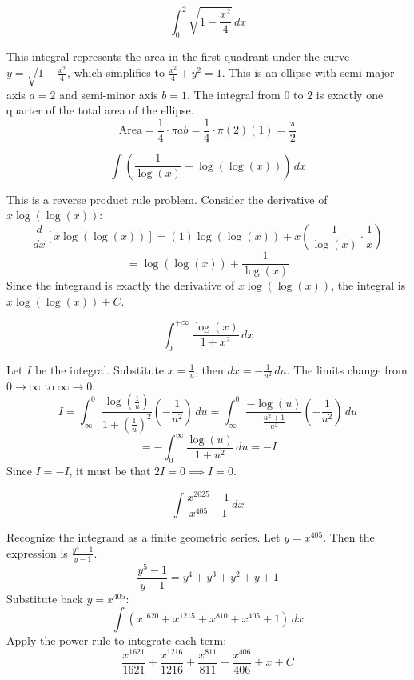 \begin{questions}
    \question \[\int_0^2 \sqrt{1 - \frac{x^2}{4}} \,dx\]
    \begin{solution}
        This integral represents the area in the first quadrant under the curve $y = \sqrt{1 - \frac{x^2}{4}}$, which simplifies to $\frac{x^2}{4} + y^2 = 1$.
        This is an ellipse with semi-major axis $a=2$ and semi-minor axis $b=1$.
        The integral from $0$ to $2$ is exactly one quarter of the total area of the ellipse.
        \[\text{Area} = \frac{1}{4} \cdot \pi a b = \frac{1}{4} \cdot \pi(2)(1) = \frac{\pi}{2}\]
    \end{solution}

    \question \[\int \left( \frac{1}{\log(x)} + \log(\log(x)) \right) \,dx\]
    \begin{solution}
        This is a reverse product rule problem. Consider the derivative of $x \log(\log(x))$:
        \[\frac{d}{dx} \left[ x \log(\log(x)) \right] = (1)\log(\log(x)) + x \left( \frac{1}{\log(x)} \cdot \frac{1}{x} \right)\]
        \[= \log(\log(x)) + \frac{1}{\log(x)}\]
        Since the integrand is exactly the derivative of $x \log(\log(x))$, the integral is $x \log(\log(x)) + C$.
    \end{solution}

    \question \[\int_0^{+\infty} \frac{\log(x)}{1+x^2} \,dx\]
    \begin{solution}
        Let $I$ be the integral. Substitute $x = \frac{1}{u}$, then $dx = -\frac{1}{u^2}\,du$.
        The limits change from $0 \to \infty$ to $\infty \to 0$.
        \[I = \int_\infty^0 \frac{\log(\frac{1}{u})}{1+(\frac{1}{u})^2} \left(-\frac{1}{u^2}\right) \,du = \int_\infty^0 \frac{-\log(u)}{\frac{u^2+1}{u^2}} \left(-\frac{1}{u^2}\right) \,du\]
        \[= -\int_0^\infty \frac{\log(u)}{1+u^2} \,du = -I\]
        Since $I = -I$, it must be that $2I = 0 \implies I = 0$.
    \end{solution}

    \question \[\int \frac{x^{2025} - 1}{x^{405} - 1} \,dx\]
    \begin{solution}
        Recognize the integrand as a finite geometric series. Let $y = x^{405}$. Then the expression is $\frac{y^5 - 1}{y - 1}$.
        \[\frac{y^5 - 1}{y - 1} = y^4 + y^3 + y^2 + y + 1\]
        Substitute back $y = x^{405}$:
        \[\int (x^{1620} + x^{1215} + x^{810} + x^{405} + 1) \,dx\]
        Apply the power rule to integrate each term:
        \[\frac{x^{1621}}{1621} + \frac{x^{1216}}{1216} + \frac{x^{811}}{811} + \frac{x^{406}}{406} + x + C\]
    \end{solution}


\end{questions}
